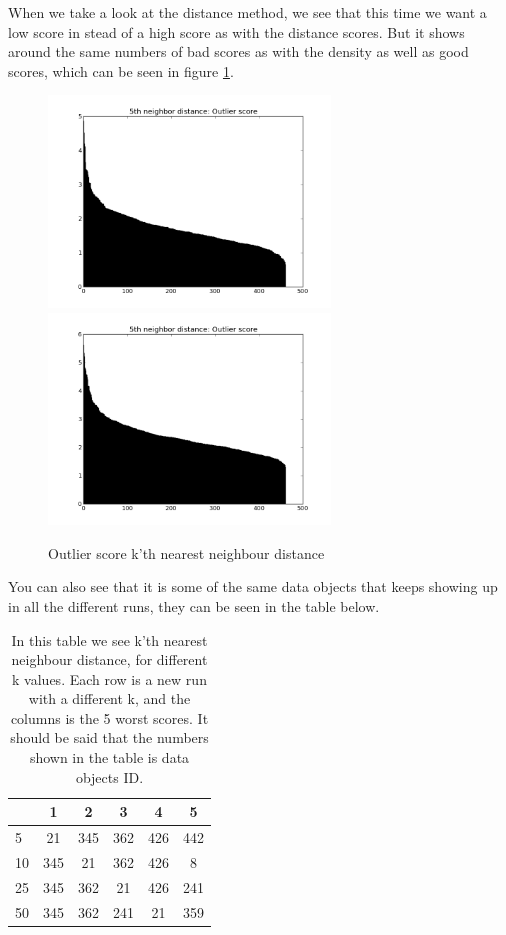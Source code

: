 When we take a look at the distance method, we see that this time we want a low score in stead of a high score as with the distance scores. But it shows around the same numbers of bad scores as with the density as well as good scores, which can be seen in figure \ref{dist}. 
\begin{figure}[H]
\centering
\includegraphics[width=7.5cm, keepaspectratio=true]{pictures/knndistance5.png}
\includegraphics[width=7.5cm, keepaspectratio=true]{pictures/knndistance25.png}
\vspace{-0.4cm}
\caption{\footnotesize Outlier score k'th nearest neighbour distance}
\label{dist}
\end{figure}
You can also see that it is some of the same data objects that keeps showing up in all the different runs, they can be seen in the table below.
\begin{table}[H]
\begin{longtable}{lccccc}
\hline
   & 1   & 2   & 3   & 4   & 5   \\ \hline
5  & 21  & 345 & 362 & 426 & 442 \\ 
10 & 345 & 21  & 362 & 426 & 8   \\ 
25 & 345 & 362 & 21  & 426 & 241 \\
50 & 345 & 362 & 241 & 21  & 359 \\ \hline
\end{longtable}
\caption{\footnotesize In this table we see k'th nearest neighbour distance, for different k values. Each row is a new run with a different k, and the columns is the 5 worst scores. It should be said that the numbers shown in the table is data objects ID.}
\end{table}

